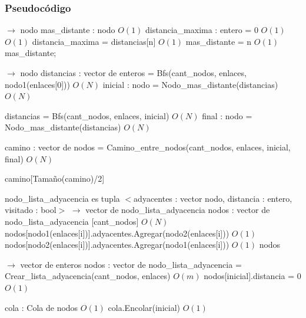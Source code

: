 \documentclass[a4paper, 10pt, twoside]{article}
\newenvironment{pseudo}[1][]{%
    \vspace{0.5em}%
    \begin{algorithmic}%
}
{%
    \end{algorithmic}%
    \vspace{0.5em}%
}
\newcommand{\Ode}[1]{\hfill $O(#1)$}
\begin{document}
\subsubsection{Pseudocódigo}

\begin{pseudo}
 $\rightarrow$ nodo
  \State mas\_distante : nodo                         \Ode{1}
  \State distancia\_maxima : entero = 0                   \Ode{1}
                    \Ode{1}
      \State distancia\_maxima = distancias[n]                \Ode{1}
      \State mas\_distante = n                        \Ode{1}
    \EndIf
  \EndFor
  \Return mas\_distante;
\EndProcedure

 $\rightarrow$ nodo
  \State distancias : vector de enteros = Bfs(cant\_nodos, enlaces, nodo1(enlaces[0])) \Ode{N}
  \State inicial : nodo = Nodo\_mas\_distante(distancias)           \Ode{N}

  \State distancias = Bfs(cant\_nodos, enlaces, inicial)            \Ode{N}
  \State final : nodo = Nodo\_mas\_distante(distancias)           \Ode{N}

  \State camino : vector de nodos = Camino\_entre\_nodos(cant\_nodos, enlaces, inicial, final) \Ode{N}
  
  \Return camino[Tamaño(camino)/2]
\EndProcedure

nodo\_lista\_adyacencia es tupla $<$adyacentes : vector nodo, distancia : entero, visitado : bool$>$
 $\rightarrow$ vector de nodo\_lista\_adyacencia
  \State nodos : vector de nodo\_lista\_adyacencia [cant\_nodos]        \Ode{N}
    \State nodos[nodo1(enlaces[i])].adyacentes.Agregar(nodo2(enlaces[i])) \Ode{1}
    \State nodos[nodo2(enlaces[i])].adyacentes.Agregar(nodo1(enlaces[i])) \Ode{1}
   \EndFor
  \Return nodos
\EndProcedure

 $\rightarrow$ vector de enteros
  \State nodos : vector de nodo\_lista\_adyacencia = Crear\_lista\_adyacencia(cant\_nodos, enlaces) \Ode{m}
  \State nodos[inicial].distancia = 0                     \Ode{1}

  \State cola : Cola de nodos                         \Ode{1}
  \State cola.Encolar(inicial)                        \Ode{1}
  

\end{pseudo}
\end{document}
